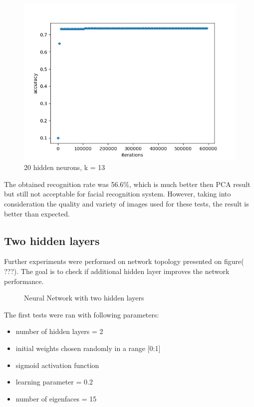 \begin{figure}[H]
\centering
\includegraphics[scale=0.5]{img/tests/lwf/40ppl/PCAk15h20.png}
\caption{20 hidden neurons, k = 13}
\end{figure} 

The obtained recognition rate was 56.6\%, which is much better then PCA result but still not acceptable for facial recognition system. However, taking into consideration the quality and variety of images used for these tests, the result is better than expected.


\subsection{Two hidden layers}

Further experiments were performed on network topology presented on figure( ???). The goal is to check if additional hidden layer improves the network performance.

\begin{figure}[!h]
\centering

\caption{Neural Network with two hidden layers}
\end{figure}

The first tests were ran with following parameters:

\begin{itemize}
\itemsep0em
\item number of hidden layers = 2
\item initial weights chosen randomly in a range [0:1]
\item sigmoid activation function
\item learning parameter = 0.2
\item number of eigenfaces = 15
\end{itemize}

